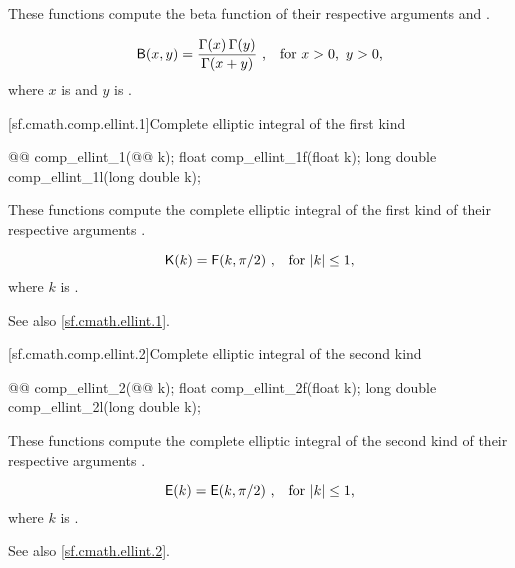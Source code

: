 \begin{itemdescr}
\pnum
\effects
These functions compute
the beta function
of their respective arguments
 and .

\pnum
\returns
\[ \mathsf{B}(x, y) = \frac{\Gamma(x) \, \Gamma(y)}{\Gamma(x + y)}
   \text{ ,\quad for $x > 0$,\, $y > 0$,} \]
where
$x$ is  and
$y$ is .
\end{itemdescr}

[sf.cmath.comp.ellint.1]{Complete elliptic integral of the first kind}%
%
%
%
%
%
\begin{itemdecl}
@@ comp_ellint_1(@@ k);
float        comp_ellint_1f(float k);
long double  comp_ellint_1l(long double k);
\end{itemdecl}

\begin{itemdescr}
\pnum
\effects
These functions compute
the complete elliptic integral of the first kind
of their respective arguments
.

\pnum
\returns
\[ \mathsf{K}(k) = \mathsf{F}(k, \pi / 2) \text{ ,\quad for $|k| \le 1$,} \]
where
$k$ is .

\pnum
See also \ref{sf.cmath.ellint.1}.
\end{itemdescr}

[sf.cmath.comp.ellint.2]{Complete elliptic integral of the second kind}%
%
%
%
%
%
\begin{itemdecl}
@@ comp_ellint_2(@@ k);
float        comp_ellint_2f(float k);
long double  comp_ellint_2l(long double k);
\end{itemdecl}

\begin{itemdescr}
\pnum
\effects
These functions compute
the complete elliptic integral of the second kind
of their respective arguments
.

\pnum
\returns
\[ \mathsf{E}(k) = \mathsf{E}(k, \pi / 2) \text{ ,\quad for $|k| \le 1$,} \]
where
$k$ is .

\pnum
See also \ref{sf.cmath.ellint.2}.
\end{itemdescr}

